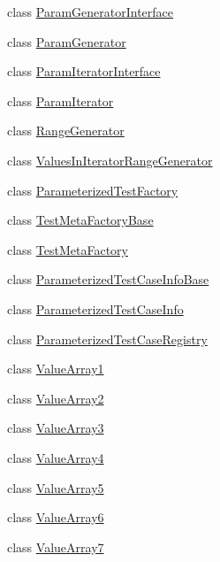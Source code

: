 \begin{DoxyCompactItemize}
class \hyperlink{classtesting_1_1internal_1_1_param_generator_interface}{Param\-Generator\-Interface}
\item 
class \hyperlink{classtesting_1_1internal_1_1_param_generator}{Param\-Generator}
\item 
class \hyperlink{classtesting_1_1internal_1_1_param_iterator_interface}{Param\-Iterator\-Interface}
\item 
class \hyperlink{classtesting_1_1internal_1_1_param_iterator}{Param\-Iterator}
\item 
class \hyperlink{classtesting_1_1internal_1_1_range_generator}{Range\-Generator}
\item 
class \hyperlink{classtesting_1_1internal_1_1_values_in_iterator_range_generator}{Values\-In\-Iterator\-Range\-Generator}
\item 
class \hyperlink{classtesting_1_1internal_1_1_parameterized_test_factory}{Parameterized\-Test\-Factory}
\item 
class \hyperlink{classtesting_1_1internal_1_1_test_meta_factory_base}{Test\-Meta\-Factory\-Base}
\item 
class \hyperlink{classtesting_1_1internal_1_1_test_meta_factory}{Test\-Meta\-Factory}
\item 
class \hyperlink{classtesting_1_1internal_1_1_parameterized_test_case_info_base}{Parameterized\-Test\-Case\-Info\-Base}
\item 
class \hyperlink{classtesting_1_1internal_1_1_parameterized_test_case_info}{Parameterized\-Test\-Case\-Info}
\item 
class \hyperlink{classtesting_1_1internal_1_1_parameterized_test_case_registry}{Parameterized\-Test\-Case\-Registry}
\item 
class \hyperlink{classtesting_1_1internal_1_1_value_array1}{Value\-Array1}
\item 
class \hyperlink{classtesting_1_1internal_1_1_value_array2}{Value\-Array2}
\item 
class \hyperlink{classtesting_1_1internal_1_1_value_array3}{Value\-Array3}
\item 
class \hyperlink{classtesting_1_1internal_1_1_value_array4}{Value\-Array4}
\item 
class \hyperlink{classtesting_1_1internal_1_1_value_array5}{Value\-Array5}
\item 
class \hyperlink{classtesting_1_1internal_1_1_value_array6}{Value\-Array6}
\item 
class \hyperlink{classtesting_1_1internal_1_1_value_array7}{Value\-Array7}
\item 

\end{DoxyCompactItemize}
